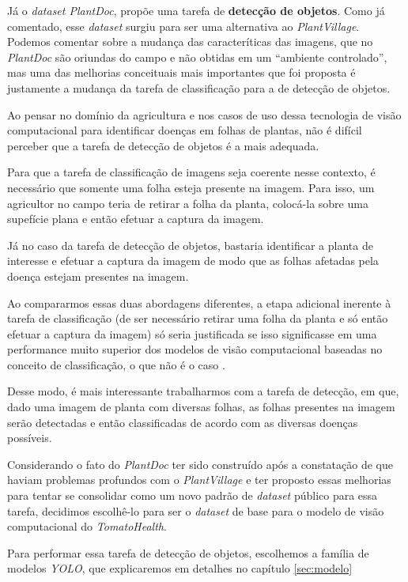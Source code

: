 Já o \emph{dataset PlantDoc}, propõe uma tarefa de {\bf detecção de objetos}. Como já comentado, esse \emph{dataset} surgiu para ser uma alternativa ao \emph{PlantVillage}. Podemos comentar sobre a mudança das caracteríticas das imagens, que no \emph{PlantDoc} são oriundas do campo e não obtidas em um ``ambiente controlado'', mas uma das melhorias conceituais mais importantes que foi proposta é justamente a mudança da tarefa de classificação para a de detecção de objetos.

Ao pensar no domínio da agricultura e nos casos de uso dessa tecnologia de visão computacional para identificar doenças em folhas de plantas, não é difícil perceber que a tarefa de detecção de objetos é a mais adequada. 

Para que a tarefa de classificação de imagens seja coerente nesse contexto, é necessário que somente uma folha esteja presente na imagem. Para isso, um agricultor no campo teria de retirar a folha da planta, colocá-la sobre uma supefície plana e então efetuar a captura da imagem.

Já no caso da tarefa de detecção de objetos, bastaria identificar a planta de interesse e efetuar a captura da imagem de modo que as folhas afetadas pela doença estejam presentes na imagem.

Ao compararmos essas duas abordagens diferentes, a etapa adicional inerente à tarefa de classificação (de ser necessário retirar uma folha da planta e só então efetuar a captura da imagem) só seria justificada se isso significasse em uma performance muito superior dos modelos de visão computacional baseadas no conceito de classificação, o que não é o caso \citep{Singh2020}.

Desse modo, é mais interessante trabalharmos com a tarefa de detecção, em que, dado uma imagem de planta com diversas folhas, as folhas presentes na imagem serão detectadas e então classificadas de acordo com as diversas doenças possíveis.

Considerando o fato do \emph{PlantDoc} ter sido construído após a constatação de que haviam problemas profundos com o \emph{PlantVillage} e ter proposto essas melhorias para tentar se consolidar como um novo padrão de \emph{dataset} público para essa tarefa, decidimos escolhê-lo para ser o \emph{dataset} de base para o modelo de visão computacional do \emph{TomatoHealth}.

Para performar essa tarefa de detecção de objetos, escolhemos a família de modelos \emph{YOLO}, que explicaremos em detalhes no capítulo \ref{sec:modelo}

